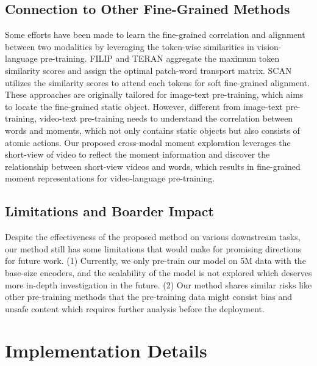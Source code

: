 \documentclass[10pt,twocolumn,letterpaper]{article}
\begin{document}
\subsection{Connection to Other Fine-Grained Methods}
Some efforts \cite{lee2018scan, yao2021filip, messina2021teran} have been made to learn the fine-grained correlation and alignment between two modalities by leveraging the token-wise similarities in vision-language pre-training. FILIP \cite{yao2021filip} and TERAN \cite{messina2021teran} aggregate the maximum token similarity scores and assign the optimal patch-word transport matrix. SCAN \cite{lee2018scan} utilizes the similarity scores to attend each tokens for soft fine-grained alignment. These approaches are originally tailored for image-text pre-training, which aims to locate the fine-grained static object. However, different from image-text pre-training, video-text pre-training needs to understand the correlation between words and moments, which not only contains static objects but also consists of atomic actions. Our proposed cross-modal moment exploration leverages the short-view of video to reflect the moment information and discover the relationship between short-view videos and words, which results in fine-grained moment representations for video-language pre-training.

\subsection{Limitations and Boarder Impact}
Despite the effectiveness of the proposed method on various downstream tasks, our method still has some limitations that would make for promising directions for future work. (1) Currently, we only pre-train our model on 5M data with the base-size encoders, and the scalability of the model is not explored which deserves more in-depth investigation in the future. (2) Our method shares similar risks like other pre-training methods that the pre-training data might consist bias and unsafe content which requires further analysis before the deployment.

\section{Implementation Details}
\end{document}
